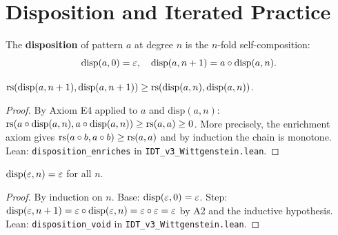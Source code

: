 \section{Disposition and Iterated Practice}

\begin{definition}[Disposition]
\label{def:disposition}
The \textbf{disposition} of pattern $a$ at degree $n$ is the $n$-fold
self-composition:
\[
\mathrm{disp}(a, 0) = \varepsilon, \quad \mathrm{disp}(a, n+1) = a \circ \mathrm{disp}(a, n).
\]
\end{definition}

\begin{theorem}
\label{thm:disp-enriches}
$\mathrm{rs}(\mathrm{disp}(a, n+1), \mathrm{disp}(a, n+1)) \geq
\mathrm{rs}(\mathrm{disp}(a, n), \mathrm{disp}(a, n))$.
\end{theorem}

\begin{proof}
By Axiom E4 applied to $a$ and $\mathrm{disp}(a, n)$:
$\mathrm{rs}(a \circ \mathrm{disp}(a, n), a \circ \mathrm{disp}(a, n))
\geq \mathrm{rs}(a, a) \geq 0$. More precisely, the enrichment axiom gives
$\mathrm{rs}(a \circ b, a \circ b) \geq \mathrm{rs}(a, a)$ and by induction
the chain is monotone.
Lean: \texttt{disposition\_enriches} in \texttt{IDT\_v3\_Wittgenstein.lean}.
\end{proof}

\begin{theorem}
\label{thm:void-disp}
$\mathrm{disp}(\varepsilon, n) = \varepsilon$ for all $n$.
\end{theorem}

\begin{proof}
By induction on $n$. Base: $\mathrm{disp}(\varepsilon, 0) = \varepsilon$. Step:
$\mathrm{disp}(\varepsilon, n+1) = \varepsilon \circ \mathrm{disp}(\varepsilon, n)
= \varepsilon \circ \varepsilon = \varepsilon$ by A2 and the inductive hypothesis.
Lean: \texttt{disposition\_void} in \texttt{IDT\_v3\_Wittgenstein.lean}.
\end{proof}

